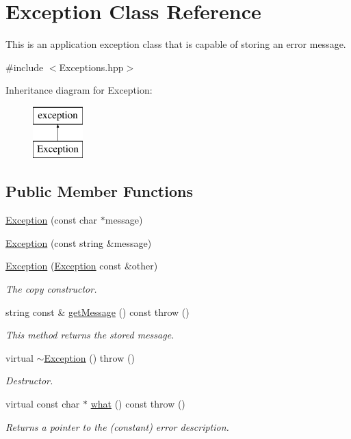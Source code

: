 \hypertarget{class_exception}{}\section{Exception Class Reference}
\label{class_exception}


This is an application exception class that is capable of storing an error message.  




{\ttfamily \#include $<$Exceptions.\+hpp$>$}

Inheritance diagram for Exception\+:\begin{figure}[H]
\begin{center}
\leavevmode
\includegraphics[height=2.000000cm]{class_exception}
\end{center}
\end{figure}
\subsection*{Public Member Functions}
\begin{DoxyCompactItemize}
\item 
\hyperlink{class_exception_ac541ead5c20548813d7dea73c28c7fab}{Exception} (const char $\ast$message)
\item 
\hyperlink{class_exception_aad1be11dc85840f8a7fac731057ab715}{Exception} (const string \&message)
\item 
\hyperlink{class_exception_a3623ce1b8b6435348d98c415b7a40d44}{Exception} (\hyperlink{class_exception}{Exception} const \&other)
\begin{DoxyCompactList}\small\item\em The copy constructor. \end{DoxyCompactList}\item 
string const \& \hyperlink{class_exception_af7b8adbf8470f04f2bd6313af3b877de}{get\+Message} () const   throw ()
\begin{DoxyCompactList}\small\item\em This method returns the stored message. \end{DoxyCompactList}\item 
virtual \hyperlink{class_exception_ad1ba411de295ef2eeb02ba26284a829a}{$\sim$\+Exception} ()  throw ()
\begin{DoxyCompactList}\small\item\em Destructor. \end{DoxyCompactList}\item 
virtual const char $\ast$ \hyperlink{class_exception_a78154a31544a609cbd226d32574f52cd}{what} () const   throw ()
\begin{DoxyCompactList}\small\item\em Returns a pointer to the (constant) error description. \end{DoxyCompactList}\end{DoxyCompactItemize}


